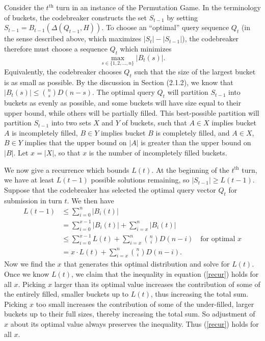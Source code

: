\documentclass[12pt, a4paper]{article}
\newcommand{\nth}{^{\text{th}}}       %
\begin{document}
		 Consider the $t\nth$ turn in an instance of the Permutation Game. In the terminology of buckets, the codebreaker constructs the set $S_{t-1}$ by setting $S_{t-1} = B_{t-1}(\Delta(Q_{t-1}, H))$. To choose an ``optimal'' query sequence $Q_t$ (in the sense described above, which maximizes $|S_{t}| - |S_{t-1}|$), the codebreaker therefore must choose a sequence $Q_t$ which minimizes
		 \begin{equation*}
			\max_{s\in\{1,2,\ldots,n\}}|B_{t}(s)|.
		 \end{equation*}
		 Equivalently, the codebreaker chooses $Q_t$ such that the size of the largest bucket is as small as possible. By the discussion in Section (2.1.2), we know that $|B_t(s)|\le\binom{n}{s}D(n-s)$. The optimal query $Q_t$ will partition $S_{t-1}$ into buckets as evenly as possible, and some buckets will have size equal to their upper bound, while others will be partially filled. This best-possible partition will partition $S_{t-1}$ into two sets $X$ and $Y$ of buckets, such that $A\in X$ implies bucket $A$ is incompletely filled, $B\in Y$ implies bucket $B$ is completely filled, and $A\in X$, $B\in Y$ implies that the upper bound on $|A|$ is greater than the upper bound on $|B|$. Let $x = |X|$, so that $x$ is the number of incompletely filled buckets.
		 
		 We now give a recurrence which bounds $L(t)$. At the beginning of the $t^\text{th}$ turn, we have at least $L(t-1)$ possible solutions remaining, so $|S_{t-1}|\ge L(t-1)$. Suppose that the codebreaker has selected the optimal query vector $Q_t$ for submission in turn $t$. We then have 
		\begin{align}\label{recur}
			L(t-1)
			& \le \sum_{i = 0}^{n}|B_i(t)|\nonumber\\
			& = \sum_{i=0}^{x-1}|B_i(t)| + \sum_{i=x}^{n}|B_i(t)|\nonumber\\
			& \le \sum_{i = 0}^{x-1}L(t) + \sum_{i=x}^{n}\binom{n}{i}D(n-i)\quad
			\text{for optimal $x$}\nonumber\\
			& = x\cdot L(t) + \sum_{i = x}^{n}\binom{n}{i}D(n-i).
		\end{align}
		Now we find the $x$ that generates this optimal distribution and solve for $L(t)$. Once we know $L(t)$, we claim that the inequality in equation (\ref{recur}) holds for all $x$. Picking $x$ larger than its optimal value increases the contribution of some of the entirely filled, smaller buckets up to $L(t)$, thus increasing the total sum. Picking $x$ too small increases the contribution of some of the under-filled, larger buckets up to their full sizes, thereby increasing the total sum. So adjustment of $x$ about its optimal value always preserves the inequality. Thus (\ref{recur}) holds for all $x$.
\end{document}
